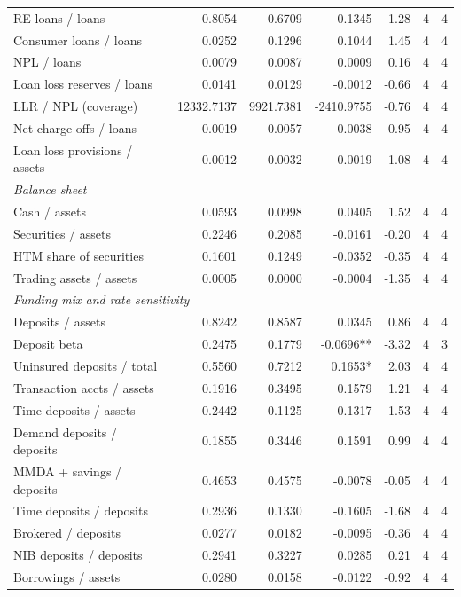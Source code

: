 \begin{tabular}{lrrrrrr}
RE loans / loans & 0.8054 & 0.6709 & -0.1345 & -1.28 & 4 & 4 \\
Consumer loans / loans & 0.0252 & 0.1296 & 0.1044 & 1.45 & 4 & 4 \\
NPL / loans & 0.0079 & 0.0087 & 0.0009 & 0.16 & 4 & 4 \\
Loan loss reserves / loans & 0.0141 & 0.0129 & -0.0012 & -0.66 & 4 & 4 \\
LLR / NPL (coverage) & 12332.7137 & 9921.7381 & -2410.9755 & -0.76 & 4 & 4 \\
Net charge-offs / loans & 0.0019 & 0.0057 & 0.0038 & 0.95 & 4 & 4 \\
Loan loss provisions / assets & 0.0012 & 0.0032 & 0.0019 & 1.08 & 4 & 4 \\
\midrule
\multicolumn{7}{l}{\emph{Balance sheet}} \\
\midrule
Cash / assets & 0.0593 & 0.0998 & 0.0405 & 1.52 & 4 & 4 \\
Securities / assets & 0.2246 & 0.2085 & -0.0161 & -0.20 & 4 & 4 \\
HTM share of securities & 0.1601 & 0.1249 & -0.0352 & -0.35 & 4 & 4 \\
Trading assets / assets & 0.0005 & 0.0000 & -0.0004 & -1.35 & 4 & 4 \\
\midrule
\multicolumn{7}{l}{\emph{Funding mix and rate sensitivity}} \\
\midrule
Deposits / assets & 0.8242 & 0.8587 & 0.0345 & 0.86 & 4 & 4 \\
Deposit beta & 0.2475 & 0.1779 & -0.0696** & -3.32 & 4 & 3 \\
Uninsured deposits / total & 0.5560 & 0.7212 & 0.1653* & 2.03 & 4 & 4 \\
Transaction accts / assets & 0.1916 & 0.3495 & 0.1579 & 1.21 & 4 & 4 \\
Time deposits / assets & 0.2442 & 0.1125 & -0.1317 & -1.53 & 4 & 4 \\
Demand deposits / deposits & 0.1855 & 0.3446 & 0.1591 & 0.99 & 4 & 4 \\
MMDA + savings / deposits & 0.4653 & 0.4575 & -0.0078 & -0.05 & 4 & 4 \\
Time deposits / deposits & 0.2936 & 0.1330 & -0.1605 & -1.68 & 4 & 4 \\
Brokered / deposits & 0.0277 & 0.0182 & -0.0095 & -0.36 & 4 & 4 \\
NIB deposits / deposits & 0.2941 & 0.3227 & 0.0285 & 0.21 & 4 & 4 \\
Borrowings / assets & 0.0280 & 0.0158 & -0.0122 & -0.92 & 4 & 4 \\

\end{tabular}
